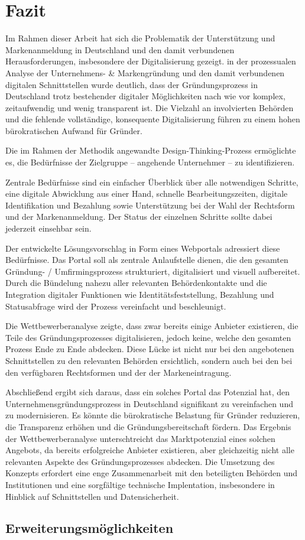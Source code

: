 \newpage

\section{Fazit} \label{fazit}

Im Rahmen dieser Arbeit hat sich die Problematik der Unterstützung und Markenanmeldung in Deutschland und den damit verbundenen Herausforderungen, insbesondere der Digitalisierung gezeigt.
in der prozessualen Analyse der Unternehmens- \& Markengründung und den damit verbundenen digitalen Schnittstellen wurde deutlich, dass der Gründungsprozess in Deutschland trotz bestehender digitaler Möglichkeiten nach wie vor komplex, zeitaufwendig und wenig transparent ist. 
Die Vielzahl an involvierten Behörden und die fehlende vollständige, konsequente Digitalisierung führen zu einem hohen bürokratischen Aufwand für Gründer.

Die im Rahmen der Methodik angewandte Design-Thinking-Prozess ermöglichte es, die Bedürfnisse der Zielgruppe – angehende Unternehmer – zu identifizieren.

Zentrale Bedürfnisse sind ein einfacher Überblick über alle notwendigen Schritte, eine digitale Abwicklung aus einer Hand, schnelle Bearbeitungszeiten, digitale Identifikation und Bezahlung sowie Unterstützung bei der Wahl der Rechtsform und der Markenanmeldung.
Der Status der einzelnen Schritte sollte dabei jederzeit einsehbar sein.

Der entwickelte Lösungsvorschlag in Form eines Webportals adressiert diese Bedürfnisse. Das Portal soll als zentrale Anlaufstelle dienen, die den gesamten Gründung- / Umfirmingsprozess strukturiert, digitalisiert und visuell aufbereitet.
Durch die Bündelung nahezu  aller relevanten Behördenkontakte und die Integration digitaler Funktionen wie Identitätsfeststellung, Bezahlung und Statusabfrage wird der Prozess vereinfacht und beschleunigt.

Die Wettbewerberanalyse zeigte, dass zwar bereits einige Anbieter existieren, die Teile des Gründungsprozesses digitalisieren, jedoch keine, welche den gesamten Prozess Ende zu Ende abdecken.
Diese Lücke ist nicht nur bei den angebotenen Schnittstellen zu den relevanten Behörden ersichtlich, sondern auch bei den bei den verfügbaren Rechtsformen und der der Markeneintragung.

Abschließend ergibt sich daraus, dass ein solches Portal das Potenzial hat, den Unternehmensgründungsprozess in Deutschland signifikant zu vereinfachen und zu modernisieren.
Es könnte die bürokratische Belastung für Gründer reduzieren, die Transparenz erhöhen und die Gründungsbereitschaft fördern.
Das Ergebnis der Wettbewerberanalyse unterschtreicht das Marktpotenzial eines solchen Angebots, da bereits erfolgreiche Anbieter existieren, aber gleichzeitig nicht alle relevanten Aspekte des Gründungsprozesses abdecken.
Die Umsetzung des Konzepts erfordert eine enge Zusammenarbeit mit den beteiligten Behörden und Institutionen und eine sorgfältige technische Implentation, insbesondere in Hinblick auf Schnittstellen und Datensicherheit.


\subsection{Erweiterungsmöglichkeiten} \label{erweiterungsmoeglichkeiten}
